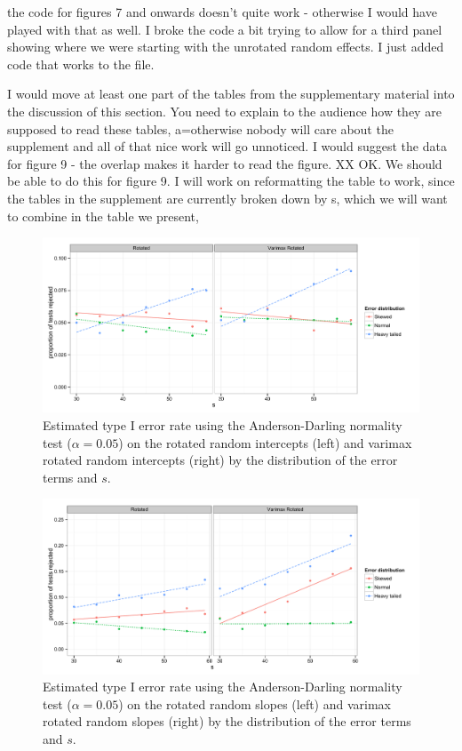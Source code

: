 \documentclass[12pt]{article} %
\newcommand{\hh}[1]{{\color{orange} #1}}
\newcommand{\al}[1]{{\color{red} #1}}
\begin{document}
\hh{the code for figures 7 and onwards doesn't quite work - otherwise I would have played with that as well. }
\al{I broke the code a bit trying to allow for a third panel showing where we were starting with the unrotated random effects. I just added code that works to the file.}

\hh{I would move at least one part of the tables from the supplementary material into the discussion of this section. You need to explain to the audience how they are supposed to read these tables, a=otherwise nobody will care about the supplement and all of that nice work will go unnoticed. I would suggest the data for figure 9 - the overlap makes it harder to read the figure. }
\al{XX OK. We should be able to do this for figure 9. I will work on reformatting the table to work, since the tables in the supplement are currently broken down by s, which we will want to combine in the table we present,}

\begin{figure}
	\centering
	\includegraphics[width=\textwidth]{ad_intercept_results.pdf}
	\caption{\label{fig:results-int} Estimated type I error rate using the Anderson-Darling normality test ($\alpha = 0.05$) on the rotated random intercepts (left) and varimax rotated random intercepts (right) by the distribution of the error terms and $s$. }
\end{figure}

\begin{figure}
	\centering
	\includegraphics[width=\textwidth]{ad_slope_results.pdf}
	\caption{\label{fig:results-slope} Estimated type I error rate using the Anderson-Darling normality test ($\alpha = 0.05$) on the rotated random slopes (left) and varimax rotated random slopes (right) by the distribution of the error terms and $s$.}
\end{figure}
\end{document}

